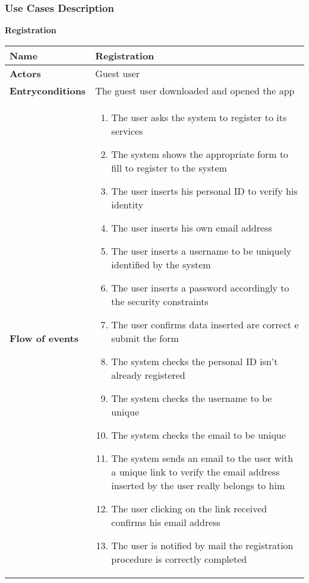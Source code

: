 \clearpage

\subsubsection{Use Cases Description}

\textbf{Registration}

\begin{longtable}{p{0.25\linewidth}p{0.75\linewidth}}
\toprule
\textbf{Name} & \textbf{Registration} \\
\midrule
\textbf{Actors} & Guest user \\
\midrule
\textbf{Entry\newline conditions} &  The guest user downloaded and opened the app\\
\midrule
\textbf{Flow of events} & 
\begin{enumerate}
	\item The user asks the system to register to its services
	\item The system shows the appropriate form to fill to register to the system
	\item The user inserts his personal ID to verify his identity
	\item The user inserts his own email address
	\item The user inserts a username to be uniquely identified by the system
	\item The user inserts a password accordingly to the security constraints
	\item The user confirms data inserted are correct e submit the form
	\item The system checks the personal ID isn't already registered
	\item The system checks the username to be unique
	\item The system checks the email to be unique
	\item The system sends an email to the user with a unique link to verify the email address inserted by the user really belongs to him
	\item The user clicking on the link received confirms his email address
	\item The user is notified by mail the registration procedure is correctly completed
\end{enumerate} \\

\midrule


\end{longtable}
